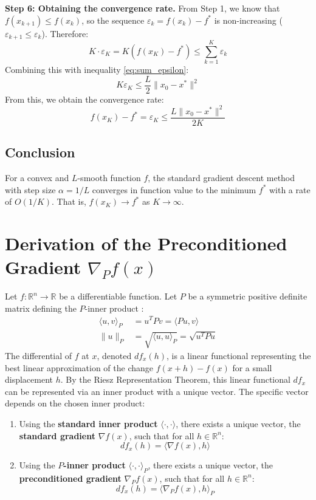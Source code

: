 \documentclass{article}
\newcommand{\R}{\mathbb{R}}
\newcommand{\norm}[1]{\|#1\|}          %
\newcommand{\normp}[1]{\|#1\|_P}       %
\newcommand{\ip}[2]{\langle #1, #2 \rangle} %
\newcommand{\grad}{\nabla}             %
\newcommand{\gradp}{\nabla_P}
\newcommand{\ipp}[2]{\langle #1, #2 \rangle_P} %
\begin{document}
\textbf{Step 6: Obtaining the convergence rate.}
From Step 1, we know that $f(x_{k+1}) \le f(x_k)$, so the sequence $\varepsilon_k = f(x_k) - f^*$ is non-increasing ($\varepsilon_{k+1} \le \varepsilon_k$). Therefore:
\begin{equation*}
    K \cdot \varepsilon_K = K (f(x_K) - f^*) \le \sum_{k=1}^{K} \varepsilon_k
\end{equation*}
Combining this with inequality \eqref{eq:sum_epsilon}:
\begin{equation*}
    K \varepsilon_K \le \frac{L}{2} \norm{x_0 - x^*}^2
\end{equation*}
From this, we obtain the convergence rate:
\begin{equation} \label{eq:convergence_rate}
    f(x_K) - f^* = \varepsilon_K \le \frac{L \norm{x_0 - x^*}^2}{2 K}
\end{equation}

\subsection*{Conclusion}
For a convex and $L$-smooth function $f$, the standard gradient descent method with step size $\alpha = 1/L$ converges in function value to the minimum $f^*$ with a rate of $O(1/K)$. That is, $f(x_K) \to f^*$ as $K \to \infty$.

\section*{Derivation of the Preconditioned Gradient $\gradp f(x)$}

Let $f: \R^n \to \R$ be a differentiable function. Let $P$ be a symmetric positive definite matrix defining the $P$-inner product :
\begin{align*}
    \ipp{u}{v} &= u^T P v = \ip{Pu}{v} \\
    \normp{u} &= \sqrt{\ipp{u}{u}} = \sqrt{u^T P u}
\end{align*}
The differential of $f$ at $x$, denoted $df_x(h)$, is a linear functional representing the best linear approximation of the change $f(x+h) - f(x)$ for a small displacement $h$.
By the Riesz Representation Theorem, this linear functional $df_x$ can be represented via an inner product with a unique vector. The specific vector depends on the chosen inner product:

\begin{enumerate}
    \item Using the \textbf{standard inner product} $\ip{\cdot}{\cdot}$, there exists a unique vector, the \textbf{standard gradient} $\grad f(x)$, such that for all $h \in \R^n$:
        \begin{equation*}
            df_x(h) = \ip{\grad f(x)}{h}
        \end{equation*}
    \item Using the \textbf{$P$-inner product} $\ipp{\cdot}{\cdot}$, there exists a unique vector, the \textbf{preconditioned gradient} $\gradp f(x)$, such that for all $h \in \R^n$:
        \begin{equation*}
            df_x(h) = \ipp{\gradp f(x)}{h}
        \end{equation*}
\end{enumerate}
\end{document}
